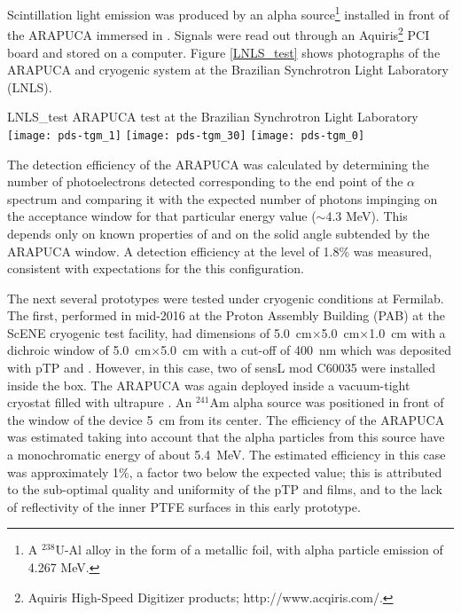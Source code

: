 Scintillation light emission was produced by an alpha source\footnote{A $^{238}$U-Al alloy in the form of a metallic foil, with alpha particle emission of 4.267 MeV.} installed in front of the ARAPUCA immersed in \lar. Signals were read out through an Aquiris\footnote{Aquiris High-Speed Digitizer products; http://www.acqiris.com/.} PCI board and stored on a computer.
Figure \ref{LNLS_test} shows photographs of the ARAPUCA and cryogenic system 
at the Brazilian Synchrotron Light Laboratory (LNLS). 

\begin{dunefigure}{LNLS_test}
{ARAPUCA test at the Brazilian Synchrotron Light Laboratory} 
	\texttt{[image: pds-tgm\_1]} \quad
	\texttt{[image: pds-tgm\_30]}\quad
	\texttt{[image: pds-tgm\_0]}
\end{dunefigure}


The detection efficiency of the ARAPUCA was calculated by  determining the number of photoelectrons detected corresponding to the end point of the $\alpha$ spectrum and comparing it with the expected number of photons impinging on the acceptance window for that  particular energy value ($\sim$4.3 MeV).  This depends only on known properties of \lar and on the solid 
angle subtended by the ARAPUCA window. A detection efficiency at the level of 1.8\%  was measured, consistent with  expectations for the this configuration\cite{Marinho:2018doi}.


The next several prototypes were tested under cryogenic conditions at Fermilab.  
The first, performed in mid-2016 at the Proton Assembly Building (PAB) at the ScENE cryogenic test facility, had dimensions of  \SI{5.0}{cm}$\times$\SI{5.0}{cm}$\times$\SI{1.0}{cm} with a dichroic window of \SI{5.0}{cm}$\times$\SI{5.0}{cm} with a cut-off of \SI{400}{nm} which was deposited with pTP and . However, in this case, two of sensL  mod C60035 were installed inside the box.  The ARAPUCA was again deployed inside a vacuum-tight cryostat filled with ultrapure \lar. An $^{241}$Am alpha source was positioned in front of the window of the device \SI{5}{cm} from its center. The efficiency of the ARAPUCA was estimated taking into account that the alpha particles from this source have a  monochromatic energy of about \SI{5.4}{MeV}. 
The estimated efficiency in this case was approximately 1\%, a factor two below the expected value; this is attributed to the sub-optimal quality and uniformity of the pTP and  films, and to the lack of reflectivity of the inner PTFE surfaces in this early prototype.

